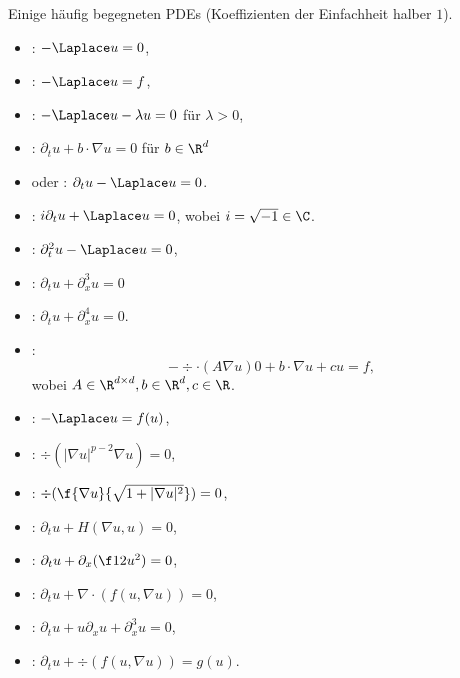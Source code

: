 \begin{ex} \label{1.10}
	Einige häufig begegneten PDEs (Koeffizienten der Einfachheit halber $1$).
	\begin{itemize}
		\item
			: $-\Laplace u = 0$,
		\item
			: $-\Laplace u = f$,
		\item
			: $-\Laplace u - \lambda u = 0$ für $\lambda > 0$,
		\item
			: $\partial_t u + b \cdot \nabla u = 0$ für $b \in \R^d$
		\item
			 oder : $\partial_t u - \Laplace u = 0$.
		\item
			: $i \partial_t u + \Laplace u = 0$, wobei $i = \sqrt{-1} \in \C$.
		\item
			: $\partial_t^2 u - \Laplace u = 0$,
		\item
			: $\partial_t u + \partial_x^3 u = 0$
		\item
			: $\partial_t u + \partial_x^4 u = 0$.
		\item
			:
			\[
				- \div \cdot (A \nabla u)0+ b \cdot \nabla u + c u = f,
			\]
			wobei $A \in \R^{d\times d}, b \in \R^d, c \in \R$.
	\end{itemize}
\end{ex}

\begin{ex} \label{1.11}
	\begin{itemize}
		\item
			: $-\Laplace u = f(u)$,
		\item
			: $\div (|\nabla u|^{p-2} \nabla u) = 0$,
		\item
			: $\div ( \f{\nabla u}{\sqrt{1 + |\nabla u|^2}} ) = 0$,
		\item
			: $\partial_t u + H(\nabla u, u) = 0$,
		\item
			: $\partial_t u + \partial_x(\f 12 u^2) = 0$,
		\item
			: $\partial_t u + \nabla \cdot(f(u, \nabla u)) = 0$,
		\item
			: $\partial_t u + u \partial_x u + \partial_x^3 u = 0$,
		\item
			: $\partial_t u + \div(f(u, \nabla u)) = g(u)$.
	\end{itemize}
\end{ex}

